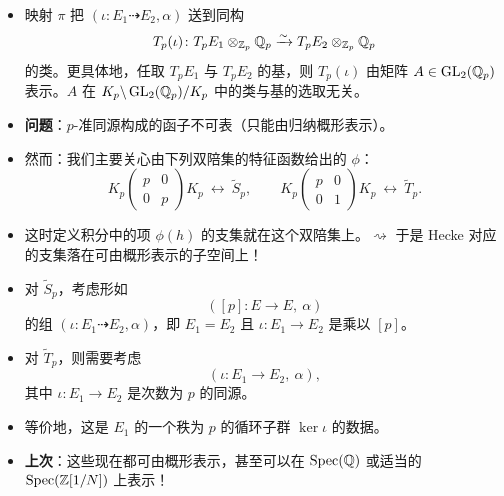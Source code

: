 \begin{itemize}
\item 映射 $\pi$ 把 $(\iota\colon E_1\dashrightarrow E_2,\alpha)$ 送到同构
\[
T_p(\iota)\colon T_pE_1\otimes_{\mathbb{Z}_p}\mathbb{Q}_p\xrightarrow{\sim}T_pE_2\otimes_{\mathbb{Z}_p}\mathbb{Q}_p
\]
的类。更具体地，任取 $T_pE_1$ 与 $T_pE_2$ 的基，则 $T_p(\iota)$ 由矩阵 $A\in\operatorname{GL}_2(\mathbb{Q}_p)$ 表示。$A$ 在 $K_p\backslash\operatorname{GL}_2(\mathbb{Q}_p)/K_p$ 中的类与基的选取无关。
\item \textbf{问题}：$p$-准同源构成的函子不可表（只能由归纳概形表示）。
\item 然而：我们主要关心由下列双陪集的特征函数给出的 $\phi$：
\[
K_p\begin{pmatrix}p&0\\0&p\end{pmatrix}K_p\ \longleftrightarrow\ \tilde S_p,\qquad
K_p\begin{pmatrix}p&0\\0&1\end{pmatrix}K_p\ \longleftrightarrow\ \tilde T_p .
\]
\item 这时定义积分中的项 $\phi(h)$ 的支集就在这个双陪集上。$\rightsquigarrow$ 于是 Hecke 对应的支集落在可由概形表示的子空间上！
\item 对 $\tilde S_p$，考虑形如
\[
([p]\colon E\to E,\ \alpha)
\]
的组 $(\iota\colon E_1\dashrightarrow E_2,\alpha)$，即 $E_1=E_2$ 且 $\iota\colon E_1\to E_2$ 是乘以 $[p]$。
\item 对 $\tilde T_p$，则需要考虑
\[
(\iota\colon E_1\to E_2,\ \alpha),
\]
其中 $\iota\colon E_1\to E_2$ 是次数为 $p$ 的同源。
\item 等价地，这是 $E_1$ 的一个秩为 $p$ 的循环子群 $\ker\iota$ 的数据。
\item \textbf{上次}：这些现在都可由概形表示，甚至可以在 $\operatorname{Spec}(\mathbb{Q})$ 或适当的 $\operatorname{Spec}(\mathbb{Z}[1/N])$ 上表示！
\end{itemize}

